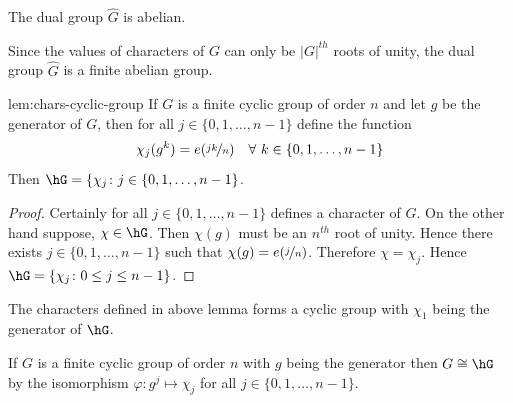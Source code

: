 \begin{observation}
The dual group $\widehat{G}$ is abelian. 
\end{observation}
Since the values of characters of $G$ can only be $|G|^{th}$ roots of unity, the dual group $\widehat{G}$ is a finite abelian group. 
\begin{lemma}{}{lem:chars-cyclic-group}
  If $G$ is a finite cyclic group of order $n$ and let $g$ be the generator of $G$, then for all $j\in\{0,1,\dots, n-1\}$ define the function $$\chi_j(g^k)=e(\nicefrac{jk}{n}) \quad \forall\ k\in \{0,1,\dots, n-1\}$$Then $\hG=\{\chi_j\colon j\in\{0,1,\dots, n-1\}$. 
\end{lemma}
\begin{proof}
  Certainly for all $j\in\{0,1,\dots, n-1\}$ defines a character of $G$. On the other hand suppose, $\chi\in\hG$. Then $\chi(g)$ must be an $n^{th}$ root of unity. Hence there exists $j\in\{0,1,\dots, n-1\}$ such that $\chi(g)=e(\nicefrac{j}{n})$. Therefore $\chi=\chi_j$. Hence $\hG=\{\chi_j\colon  0\leq j\leq n-1\}$. 
\end{proof}
\begin{observation}
  The characters defined in above lemma forms a cyclic group with $\chi_1$ being the generator of $\hG$. 
\end{observation}
\begin{corolary}{}{}
  If $G$ is a finite cyclic group of order $n$ with $g$ being the generator then $G\cong \hG$ by the isomorphism $\varphi:g^j\mapsto \chi_j$ for all $j\in\{0,1,\dots, n-1\}$. 
\end{corolary}

